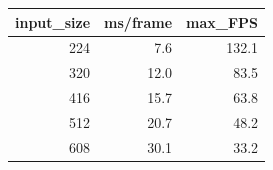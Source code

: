 \begin{tabular}{rrr}
\toprule
input_size & ms/frame & max_FPS \\
\midrule
224 & 7.6 & 132.1 \\
320 & 12.0 & 83.5 \\
416 & 15.7 & 63.8 \\
512 & 20.7 & 48.2 \\
608 & 30.1 & 33.2 \\
\bottomrule
\end{tabular}
